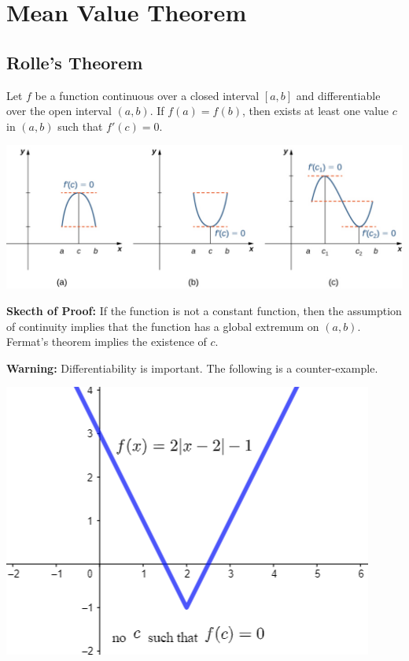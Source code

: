
\hypertarget{mean-value-theorem}{%
\section{Mean Value Theorem}\label{mean-value-theorem}}

\hypertarget{rolles-theorem}{%
\subsection{Rolle's Theorem}\label{rolles-theorem}}

Let \(f\) be a function continuous over a closed interval \([a,b]\) and
differentiable over the open interval \((a,b)\). If \(f(a)=f(b)\), then
exists at least one value \(c\) in \((a,b)\) such that \(f'(c)=0\).

\begin{fullwidth}
  \centering
  \includegraphics[scale=0.3]{img/image-20200323191523596.png}
\end{fullwidth}

\textbf{Skecth of Proof:} 
If the function is not a constant function, then the assumption of continuity implies that 
the function has a global extremum on $(a, b)$. Fermat's theorem implies the existence of $c$.

\textbf{Warning:} Differentiability is important. The following is a
counter-example.

  \includegraphics[scale=0.4]{img/image-20200323191152101.png}

